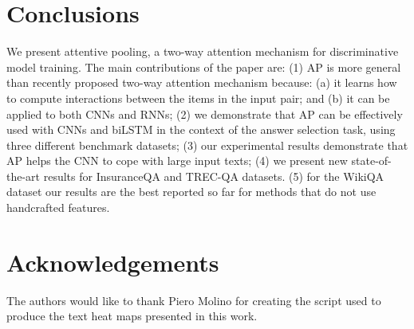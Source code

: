 \documentclass{article}
\begin{document}
 \section{Conclusions}
\label{conclusions}
We present attentive pooling,
a two-way attention mechanism for discriminative model training.
The main contributions of the paper are:
(1) AP is more general than recently proposed two-way attention mechanism because: (a) it learns how to compute interactions between the items in the input pair; and (b) it can be applied to both CNNs and RNNs;
(2) we demonstrate that AP can be effectively used with CNNs and biLSTM in the context of the answer selection task, using three different benchmark datasets;
(3) our experimental results demonstrate that AP helps the CNN to cope with large input texts;
(4) we present new state-of-the-art results for InsuranceQA and TREC-QA datasets.
(5) for the WikiQA dataset
our results are the best reported so far for methods that do not use handcrafted features.
 

\section*{Acknowledgements} 
The authors would like to thank Piero Molino for creating the script used to produce the text heat maps presented in this work.
 




\end{document}
